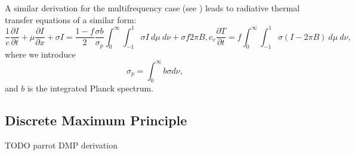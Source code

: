 A similar derivation for the multifrequency case (see \cite{FleckCumm}) leads to radiative thermal transfer equations of a similar form:
\begin{subequations}
\begin{equation}
\frac{1}{c}\frac{\partial I}{\partial t} + \mu\frac{\partial I}{\partial x}
+\sigma I =
  \frac{1-f}{2}\frac{\sigma b}{\sigma_p}\int_0^\infty\int_{-1}^1
  \sigma I\ d\mu\ d\nu + \sigma f 2\pi B,
\end{equation}
\begin{equation}
c_v\frac{\partial T}{\partial t}=f \int_0^\infty\int_ { -1 } ^1
  \sigma(I-2\pi B)\ d\mu\ d\nu,
\end{equation}
\end{subequations}
where we introduce
\begin{equation}
\sigma_p=\int_0^\infty b\sigma d\nu,
\end{equation}
and $b$ is the integrated Planck spectrum.
\subsection{Discrete Maximum Principle}
TODO parrot DMP derivation
